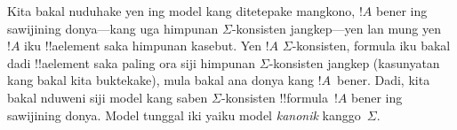 \documentclass[../../../include/open-logic-section]{subfiles}
\begin{document}
Kita bakal nuduhake yen ing model kang ditetepake mangkono,
$!A$ bener ing sawijining donya---kang uga himpunan $\Sigma$-konsisten
jangkep---yen lan mung yen $!A$ iku !!a{element} saka himpunan
kasebut. Yen $!A$ $\Sigma$-konsisten, formula iku bakal dadi
!!a{element} saka paling ora siji himpunan $\Sigma$-konsisten jangkep
(kasunyatan kang bakal kita buktekake), mula bakal ana donya kang
$!A$~bener. Dadi, kita bakal nduweni siji model kang saben
$\Sigma$-konsisten !!{formula}~$!A$ bener ing sawijining donya.
Model tunggal iki yaiku model \emph{kanonik} kanggo~$\Sigma$.
\end{document}
